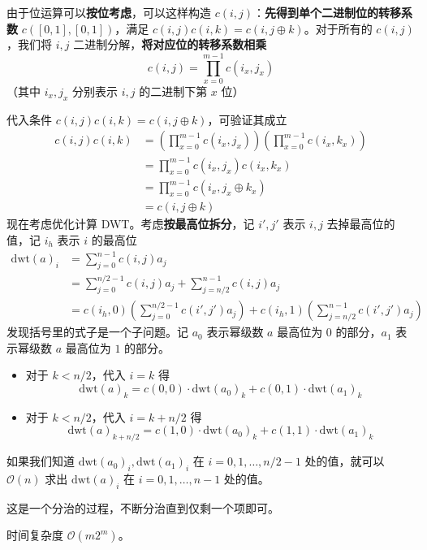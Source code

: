 由于位运算可以\textbf{按位考虑}，可以这样构造 $c(i, j)$：\textbf{先得到单个二进制位的转移系数} $c([0, 1], [0, 1])$，满足 $c(i, j)c(i, k) = c(i, j \oplus k)$。对于所有的 $c(i, j)$，我们将 $i, j$ 二进制分解，\textbf{将对应位的转移系数相乘}
\[
c(i, j) = \prod_{x = 0}^{m - 1} c(i_x, j_x)
\]
（其中 $i_x, j_x$ 分别表示 $i, j$ 的二进制下第 $x$ 位）

代入条件 $c(i, j)c(i, k) = c(i, j \oplus k)$，可验证其成立
\[
\begin{aligned}
c(i, j)c(i, k) & = \left(\prod_{x = 0}^{m - 1}c(i_x, j_x)\right) \left( \prod_{x = 0}^{m - 1}c(i_x, k_x) \right) \\
& = \prod_{x = 0}^{m - 1} c(i_x, j_x)c(i_x, k_x) \\
& = \prod_{x = 0}^{m - 1} c(i_x, j_x \oplus k_x) \\
& = c(i, j \oplus k)
\end{aligned}
\]
现在考虑优化计算 DWT。考虑\textbf{按最高位拆分}，记 $i', j'$ 表示 $i, j$ 去掉最高位的值，记 $i_h$ 表示 $i$ 的最高位
\[
\begin{aligned}
\mathrm{dwt}(a)_i & = \sum_{j = 0}^{n - 1}c(i, j)a_j \\
& = \sum_{j = 0}^{n / 2 - 1}c(i, j)a_j + \sum_{j = n / 2}^{n - 1}c(i, j)a_j \\
& = c(i_h, 0) \left( \sum_{j = 0}^{n / 2 - 1}c(i', j')a_j \right) + c(i_h, 1)\left( \sum_{j = n / 2}^{n - 1}c(i', j')a_j \right)
\end{aligned}
\]
发现括号里的式子是一个子问题。记 $a_0$ 表示幂级数 $a$ 最高位为 $0$ 的部分，$a_1$ 表示幂级数 $a$ 最高位为 $1$ 的部分。

\begin{itemize}
    \item 对于 $k < n / 2$，代入 $i = k$ 得
    \[
    \mathrm{dwt}(a)_k = c(0, 0) \cdot \mathrm{dwt}(a_0)_k + c(0, 1) \cdot \mathrm{dwt}(a_1)_k
    \]

    \item 对于 $k < n / 2$，代入 $i = k + n / 2$ 得
    \[
    \mathrm{dwt}(a)_{k + n / 2} = c(1, 0) \cdot \mathrm{dwt}(a_0)_k + c(1, 1) \cdot \mathrm{dwt}(a_1)_k
    \]
\end{itemize}

如果我们知道 $\mathrm{dwt}(a_0)_i, \mathrm{dwt}(a_1)_i$ 在 $i = 0, 1, \dots, n / 2 - 1$ 处的值，就可以 $\mathcal{O}(n)$ 求出 $\mathrm{dwt}(a)_i$ 在 $i = 0, 1, \dots, n - 1$ 处的值。

这是一个分治的过程，不断分治直到仅剩一个项即可。

时间复杂度 $\mathcal{O}(m2^m)$。

